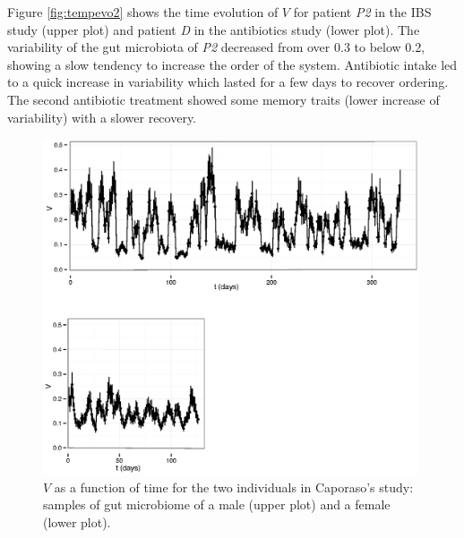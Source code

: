 Figure \ref{fig:tempevo2} shows the time evolution of $V$ for patient \emph{P2} in the IBS study\cite{IBS} (upper plot) and patient \emph{D} in the antibiotics study\cite{antibiotic} (lower plot). The variability of the gut microbiota of \emph{P2} decreased from over 0.3 to below 0.2, showing a slow tendency to increase the order of the system.  Antibiotic intake led to a quick increase in variability which lasted for a few days to recover ordering. The second antibiotic treatment showed some memory traits (lower increase of variability) with a slower recovery. 

\begin{figure}
	\includegraphics[width=0.99\textwidth]{figs/Fig6.eps}
\caption{$V$ as a function of time for the two individuals in Caporaso's study\cite{moving}: samples of gut microbiome of a male (upper plot) and a female (lower plot).}
\label{fig:tempevo1}
\end{figure}

